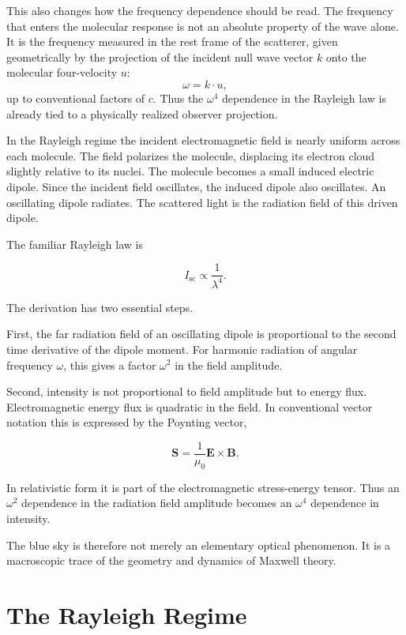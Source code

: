 \documentclass[11pt,a4paper]{article}
\begin{document}
This also changes how the frequency dependence should be read. The frequency
that enters the molecular response is not an absolute property of the wave
alone. It is the frequency measured in the rest frame of the scatterer, given
geometrically by the projection of the incident null wave vector \(k\) onto the
molecular four-velocity \(u\):
\[
\omega = k\cdot u,
\]
up to conventional factors of \(c\). Thus the \(\omega^4\) dependence in the
Rayleigh law is already tied to a physically realized observer projection.

In the Rayleigh regime the incident electromagnetic field is nearly uniform
across each molecule. The field polarizes the molecule, displacing its electron
cloud slightly relative to its nuclei. The molecule becomes a small induced
electric dipole. Since the incident field oscillates, the induced dipole also
oscillates. An oscillating dipole radiates. The scattered light is the
radiation field of this driven dipole.

The familiar Rayleigh law is

\begin{equation}
I_{\mathrm{sc}} \propto \frac{1}{\lambda^4}.
\end{equation}

The derivation has two essential steps.

First, the far radiation field of an oscillating dipole is proportional to the
second time derivative of the dipole moment. For harmonic radiation of angular
frequency \(\omega\), this gives a factor \(\omega^2\) in the field amplitude.

Second, intensity is not proportional to field amplitude but to energy flux.
Electromagnetic energy flux is quadratic in the field. In conventional vector
notation this is expressed by the Poynting vector,

\begin{equation}
\mathbf{S} = \frac{1}{\mu_0}\mathbf{E}\times\mathbf{B}.
\end{equation}

In relativistic form it is part of the electromagnetic stress-energy tensor.
Thus an \(\omega^2\) dependence in the radiation field amplitude becomes an
\(\omega^4\) dependence in intensity.

The blue sky is therefore not merely an elementary optical phenomenon. It is a
macroscopic trace of the geometry and dynamics of Maxwell theory.

\section{The Rayleigh Regime}
\end{document}
